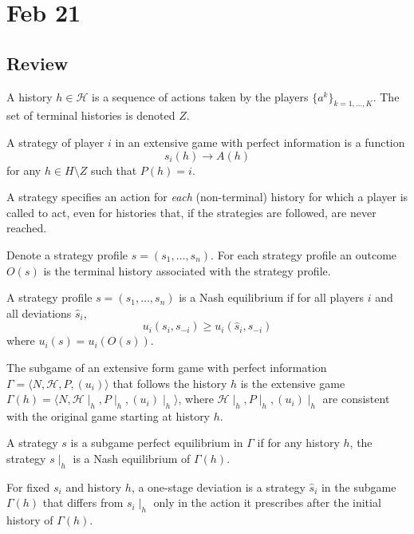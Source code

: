 \documentclass[10pt]{article}
\begin{document}
\section{Feb 21}

\subsection{Review}

\begin{definition}
	A history $h \in \mathcal{H}$ is a sequence of actions taken by the players $\{a^k\}_{k=1,\dots,K}$. The set of terminal histories is denoted $Z$.
\end{definition}
\begin{definition}
	A strategy of player $i$ in an extensive game with perfect information is a function \[s_i(h) \to A(h)\]for any $h \in H \setminus Z$ such that $P(h) = i$.
\end{definition}
\begin{remark}
	A strategy specifies an action for \emph{each} (non-terminal) history for which a player is called to act, even for histories that, if the strategies are followed, are never reached.
\end{remark}

\begin{definition}
	Denote a strategy profile $s = (s_1,\dots,s_n)$. For each strategy profile an outcome $O(s)$ is the terminal history associated with the strategy profile.
\end{definition}

\begin{definition}
	A strategy profile $s = (s_1,\dots,s_n)$ is a Nash equilibrium if for all players $i$ and all deviations $\hat{s}_i$, \[u_i(s_i,s_{-i}) \ge u_i(\hat{s}_i,s_{-i})\]where $u_i(s) = u_i(O(s))$.
\end{definition}
\begin{definition}
	The subgame of an extensive form game with perfect information $\Gamma = \langle N,\mathcal{H},P,(u_i)\rangle$ that follows the history $h$ is the extensive game $\Gamma(h) = \langle N, \mathcal{H}\mid_h,P\mid_h,(u_i)\mid_h\rangle$, where $ \mathcal{H}\mid_h,P\mid_h,(u_i)\mid_h$ are consistent with the original game starting at history $h$.
\end{definition}
\begin{definition}
	A strategy $s$ is a subgame perfect equilibrium in $\Gamma$ if for any history $h$, the strategy $s \mid_h$ is a Nash equilibrium of $\Gamma(h)$.
\end{definition}
\begin{definition}
	For fixed $s_i$ and history $h$, a one-stage deviation is a strategy $\hat{s}_i$ in the subgame $\Gamma(h)$ that differs from $s_i\mid_h$ only in the action it prescribes after the initial history of $\Gamma(h)$. 
\end{definition}
\end{document}
